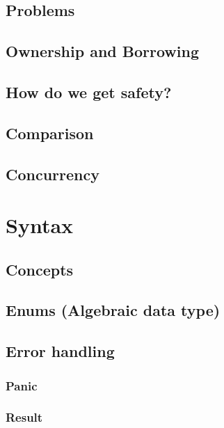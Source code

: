 \documentclass[%
final,
xcolor = table,
usenames,
dvipsnames,
table,
aspectratio = 169]{beamer}
\begin{document}
\subsection{Problems}


\subsection{Ownership and Borrowing}




\subsection{How do we get safety?}


\subsection{Comparison}


\subsection{Concurrency}



\section{Syntax}


\subsection{Concepts}


\subsection{Enums (Algebraic data type)}


\subsection{Error handling}

\subsubsection{Panic}

\subsubsection{Result}

\end{document}
